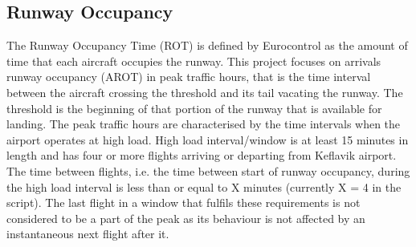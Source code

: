 \subsection{Runway Occupancy}
The Runway Occupancy Time (ROT) is defined by Eurocontrol as the amount of time that each aircraft occupies the runway\cite{ROT_definition}. This project focuses on arrivals runway occupancy (AROT) in peak traffic hours, that is the time interval between the aircraft crossing the threshold and its tail vacating the runway\cite{AROT_definition}. The threshold is the beginning of that portion of the runway that is available for landing.
The peak traffic hours are characterised by the time intervals when the airport operates at high load. High load interval/window is at least 15 minutes in length and has four or more flights arriving or departing from Keflavik airport. The time between flights, i.e. the time between start of runway occupancy, during the high load interval is less than or equal to X minutes (currently X = 4 in the script). The last flight in a window that fulfils these requirements is not considered to be a part of the peak as its behaviour is not affected by an instantaneous next flight after it. 

